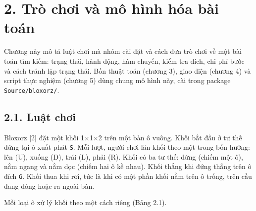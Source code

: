 \section{2. Trò chơi và mô hình hóa bài toán}

Chương này mô tả luật chơi mà nhóm cài đặt và cách đưa trò chơi về một bài toán tìm kiếm: trạng thái, hành động, hàm chuyển, kiểm tra đích, chi phí bước và cách tránh lặp trạng thái. Bốn thuật toán (chương 3), giao diện (chương 4) và script thực nghiệm (chương 5) dùng chung mô hình này, cài trong package \texttt{Source/\allowbreak{}bloxorz/\allowbreak{}}.

\subsection{2.1. Luật chơi}

Bloxorz {[}2{]} đặt một khối 1×1×2 trên một bàn ô vuông. Khối bắt đầu ở tư thế đứng tại ô xuất phát \texttt{S}. Mỗi lượt, người chơi lăn khối theo một trong bốn hướng: lên (U), xuống (D), trái (L), phải (R). Khối có ba tư thế: đứng (chiếm một ô), nằm ngang và nằm dọc (chiếm hai ô kề nhau). Khối thắng khi đứng thẳng trên ô đích \texttt{G}. Khối thua khi rơi, tức là khi có một phần khối nằm trên ô trống, trên cầu đang đóng hoặc ra ngoài bàn.

Mỗi loại ô xử lý khối theo một cách riêng (Bảng 2.1).


